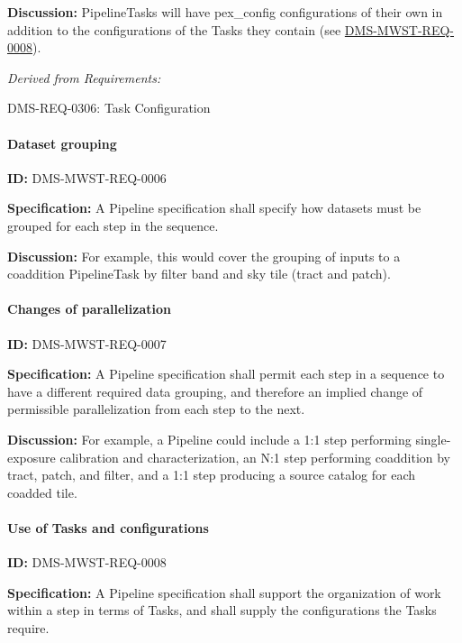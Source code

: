 \documentclass[SE,toc,lsstdraft]{lsstdoc}
\begin{document}
\textbf{Discussion:}
PipelineTasks will have pex\_config configurations of their own in addition to the configurations of the Tasks they contain (see \hyperref[DMS-MWST-REQ-0008]{DMS-MWST-REQ-0008}).

\emph{Derived from Requirements:}

DMS-REQ-0306:
Task Configuration \newline

\paragraph{Dataset grouping}\hfill  %

\label{DMS-MWST-REQ-0006}
\textbf{ID:} DMS-MWST-REQ-0006

\textbf{Specification:}
A Pipeline specification shall specify how datasets must be grouped for each step in the sequence.

\textbf{Discussion:}
For example, this would cover the grouping of inputs to a coaddition PipelineTask by filter band and sky tile (tract and patch).

\paragraph{Changes of parallelization}\hfill  %

\label{DMS-MWST-REQ-0007}
\textbf{ID:} DMS-MWST-REQ-0007

\textbf{Specification:}
A Pipeline specification shall permit each step in a sequence to have a different required data grouping, and therefore an implied change of permissible parallelization from each step to the next.

\textbf{Discussion:}
For example, a Pipeline could include a 1:1 step performing single-exposure calibration and characterization, an N:1 step performing coaddition by tract, patch, and filter, and a 1:1 step producing a source catalog for each coadded tile.

\paragraph{Use of Tasks and configurations}\hfill  %

\label{DMS-MWST-REQ-0008}
\textbf{ID:} DMS-MWST-REQ-0008

\textbf{Specification:}
A Pipeline specification shall support the organization of work within a step in terms of Tasks, and shall supply the configurations the Tasks require.
\end{document}
